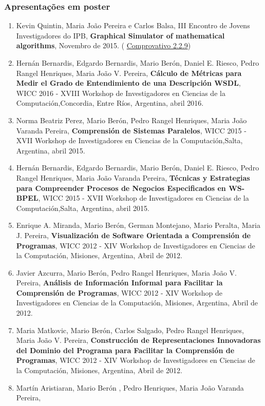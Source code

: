 \documentclass[11pt]{article}
\begin{document}
\subsubsection{Apresentações em poster}
\begin{enumerate}
\item{Kevin Quintin, Maria João Pereira e Carlos Balsa, III Encontro de Jovens Investigadores do IPB, {
\bf{ Graphical Simulator of mathematical algorithms}}, Novembro de 2015. (
\href{run:Publicacoes/CertificadoEJI.pdf}{Comprovativo 2.2.9})}
\item{Hernán Bernardis, Edgardo Bernardis, Mario Berón, Daniel E. Riesco, Pedro Rangel Henriques, Maria João V. Pereira,{
\bf{ Cálculo de Métricas para Medir el Grado de Entendimiento de una Descripción WSDL}}, WICC 2016 - XVIII Workshop de Investigadores en Ciencias de la Computación,Concordia, Entre Ríos, Argentina, abril 2016. }
\item{Norma Beatriz Perez, Mario Berón, Pedro Rangel Henriques, Maria João Varanda Pereira,{
\bf{ Comprensión de Sistemas Paralelos}}, WICC 2015 - XVII Workshop de Investigadores en Ciencias de la Computación,Salta, Argentina, abril 2015. }
\item{Hernán Bernardis, Edgardo Bernardis, Mario Berón, Daniel E. Riesco, Pedro Rangel Henriques, Maria João Varanda Pereira, {
\bf{ Técnicas y Estrategias para Compreender Procesos de Negocios Especificados en WS-BPEL}}, WICC 2015 - XVII Workshop de Investigadores en Ciencias de la Computación,Salta, Argentina, abril 2015.}
\item{Enrique A. Miranda, Mario Berón, German Montejano, Mario Peralta, Maria J. Pereira, {
\bf{ Visualización de Software Orientada a Comprensión de Programas}}, WICC 2012 - XIV Workshop de Investigadores en Ciencias de la Computación, Misiones, Argentina, Abril de 2012. }
\item{Javier Azcurra, Mario Berón, Pedro Rangel Henriques, Maria João V. Pereira, {
\bf{ Análisis de Información Informal para Facilitar la Comprensión de Programas}}, WICC 2012 - XIV Workshop de Investigadores en Ciencias de la Computación, Misiones, Argentina, Abril de 2012. }
\item{Maria Matkovic, Mario Berón, Carlos Salgado, Pedro Rangel Henriques, Maria João V. Pereira, {
\bf{ Construcción de Representaciones Innovadoras del Dominio del Programa para Facilitar la Comprensión de Programas}}, WICC 2012 - XIV Workshop de Investigadores en Ciencias de la Computación, Misiones, Argentina, Abril de 2012. }
\item{Martín Aristiaran,  Mario Berón , Pedro Henriques, Maria João Varanda Pereira, {
}}
\end{enumerate}
\end{document}
